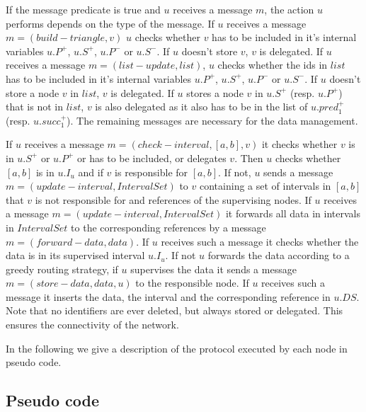 \documentclass[11pt]{article}
\begin{document}
If the message predicate is true and $u$ receives a message $m$, the
action $u$ performs depends on the type of the message. If $u$ receives a
message $m=(build-triangle,v)$ $u$ checks whether $v$ has to be included in
it's internal variables $u.P^+$, $u.S^+$, $u.P^-$ or $u.S^-$. If $u$ doesn't
store $v$, $v$ is delegated. If $u$ receives a message
$m=(list-update,list)$, $u$ checks whether the ids in $list$ has to be
included in it's internal variables $u.P^+$, $u.S^+$, $u.P^-$ or $u.S^-$. If $u$ doesn't store a node $v$ in $list$, $v$ is delegated. If $u$ stores a node
$v$ in $u.S^+$ (resp. $u.P^+$) that is not in $list$, $v$ is also delegated as
it also has to be in the list of $u.pred^+_1$ (resp. $u.succ^+_1$). The remaining
messages are necessary for the data management.

If $u$ receives a message $m=(check-interval,[a,b],v)$ it checks whether $v$
is in $u.S^+$ or $u.P^+$ or has to be included, or delegates $v$. Then $u$
checks whether $[a,b]$ is in $u.I_u$ and if $v$ is responsible for $[a,b]$. If
not, $u$ sends a message $m=(update-interval,IntervalSet)$ to $v$ containing
a set of intervals in $[a,b]$ that $v$ is not responsible for and references
of the supervising nodes.
If $u$ receives a message
$m=(update-interval,IntervalSet)$ it forwards all data in intervals in
$IntervalSet$ to the corresponding references by a message
$m=(forward-data,data)$. If $u$ receives such a message it checks whether
the data is in its supervised interval $u.I_u$. If not $u$ forwards the data
according to a greedy routing strategy, if $u$ supervises the data it sends
a message $m=(store-data,data,u)$ to the responsible node. If $u$ receives
such a message it inserts the data, the interval and the corresponding
reference in $u.DS$. Note that no identifiers are ever deleted, but always
stored or delegated. This ensures the connectivity of the network.

In the following we give a description of the protocol executed by each node
in pseudo code.

\subsection{Pseudo code}
\end{document}
